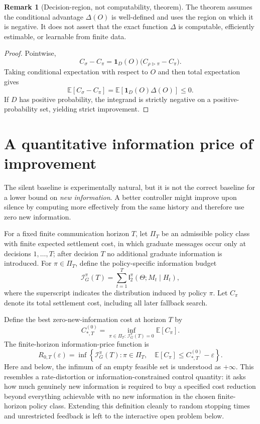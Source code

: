 \documentclass[11pt]{article}
\theoremstyle{definition}
\newtheorem{remark}[theorem]{Remark}
\newcommand{\E}{\mathbb{E}}
\newcommand{\I}{\mathsf{I}}
\begin{document}
\begin{remark}[Decision-region, not computability, theorem]
The theorem assumes the conditional advantage $\Delta(O)$ is well-defined and uses the region on which it is negative.  It does not assert that the exact function $\Delta$ is computable, efficiently estimable, or learnable from finite data.
\end{remark}

\begin{proof}
Pointwise,
\[
C_\sigma-C_\pi
=
\mathbf 1_D(O)\bigl(C_{\rho\triangleright\pi}-C_\pi\bigr).
\]
Taking conditional expectation with respect to $O$ and then total expectation gives
\[
\E[C_\sigma-C_\pi]
=
\E[\mathbf 1_D(O)\Delta(O)]\le 0.
\]
If $D$ has positive probability, the integrand is strictly negative on a positive-probability set, yielding strict improvement.
\end{proof}

\section{A quantitative information price of improvement}

The silent baseline is experimentally natural, but it is not the correct baseline for a lower bound on \emph{new information}.  A better controller might improve upon silence by computing more effectively from the same history and therefore use zero new information.

For a fixed finite communication horizon $T$, let $\Pi_T$ be an admissible policy class with finite expected settlement cost, in which graduate messages occur only at decisions $1,\ldots,T$; after decision $T$ no additional graduate information is introduced.  For $\pi\in\Pi_T$, define the policy-specific information budget
\[
\mathcal I_G^{\pi}(T)
=
\sum_{t=1}^{T}
\I_2^{\pi}(\Theta;M_t\mid H_t),
\]
where the superscript indicates the distribution induced by policy $\pi$.  Let $C_\pi$ denote its total settlement cost, including all later fallback search.

Define the best zero-new-information cost at horizon $T$ by
\[
C_{*,T}^{(0)}
=
\inf_{\pi\in\Pi_T:\,\mathcal I_G^{\pi}(T)=0}
\E[C_\pi].
\]
The finite-horizon information-price function is
\begin{equation}
R_{0,T}(\varepsilon)
=
\inf\left\{
\mathcal I_G^{\pi}(T):
\pi\in\Pi_T,\quad
\E[C_\pi]\le C_{*,T}^{(0)}-\varepsilon
\right\}.
\label{eq:rate-cost}
\end{equation}
Here and below, the infimum of an empty feasible set is understood as $+\infty$.  This resembles a rate-distortion or information-constrained control quantity: it asks how much genuinely new information is required to buy a specified cost reduction beyond everything achievable with no new information in the chosen finite-horizon policy class.  Extending this definition cleanly to random stopping times and unrestricted feedback is left to the interactive open problem below.
\end{document}
